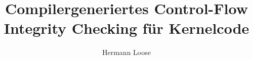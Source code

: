 \documentclass[11pt,a4paper]{article}
\title{Compilergeneriertes Control-Flow Integrity Checking für Kernelcode}
\author{Hermann Loose}
\begin{document}
\begin{titlepage}

\maketitle

%
%
%
\end{titlepage}

\tableofcontents

\renewcommand{\labelitemi}{$\square$}
\renewcommand{\labelitemii}{$\square$}
\renewcommand{\labelitemiii}{$\square$}
\renewcommand{\labelitemiv}{$\square$}

\newpage

















\newpage


\end{document}
